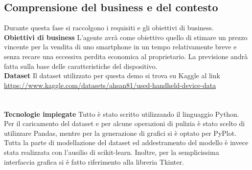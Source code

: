 \documentclass{article}
\begin{document}
    \subsection{Comprensione del business e del contesto}
    Durante questa fase si raccolgono i requisiti e gli obiettivi di business.
    \newline
    \\
    \textbf{Obiettivi di business}
    L'agente avrà come obiettivo quello di stimare un prezzo vincente per la vendita di uno smartphone in un tempo relativamente breve e senza recare una eccessiva perdita economica al proprietario. La previsione andrà fatta sulla base delle caratteristiche del dispositivo.\newline
    \\
    \textbf{Dataset}
    Il dataset utilizzato per questa demo si trova su Kaggle al link \url{https://www.kaggle.com/datasets/ahsan81/used-handheld-device-data}\newline
    \\
    \\
    \\
    \textbf{Tecnologie impiegate}
    Tutto è stato scritto utilizzando il linguaggio Python. Per il caricamento del dataset e per alcune operazioni di pulizia è stato scelto di utilizzare Pandas, mentre per la generazione di grafici si è optato per PyPlot. Tutta la parte di modellazione del dataset ed addestramento del modello è invece stata realizzata con l'ausilio di scikit-learn. Inoltre, per la semplicissima interfaccia grafica si è fatto riferimento alla libreria Tkinter.\\
\end{document}

